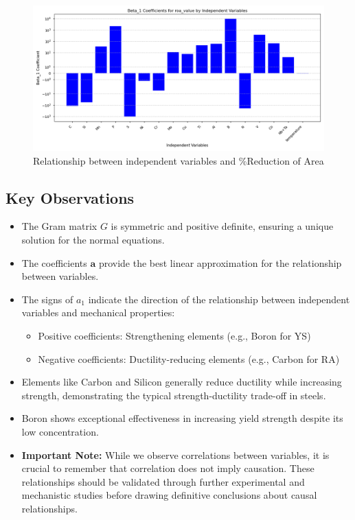 \documentclass[10pt]{article}
\begin{document}
\begin{figure}[H]
    \centering
    \includegraphics[width=\imagewidth\textwidth]{figures/03_leastsq/roa_value_beta1_bar_chart.png}
    \caption{Relationship between independent variables and \%Reduction of Area}
\end{figure}

\newpage
\subsection{Key Observations}
\begin{itemize}
    \item The Gram matrix $G$ is symmetric and positive definite, ensuring a unique solution for the normal equations.
    \item The coefficients $\mathbf{a}$ provide the best linear approximation for the relationship between variables.
    \item The signs of $a_1$ indicate the direction of the relationship between independent variables and mechanical properties:
    \begin{itemize}
        \item Positive coefficients: Strengthening elements (e.g., Boron for YS)
        \item Negative coefficients: Ductility-reducing elements (e.g., Carbon for RA)
    \end{itemize}
    \item Elements like Carbon and Silicon generally reduce ductility while increasing strength, demonstrating the typical strength-ductility trade-off in steels.
    \item Boron shows exceptional effectiveness in increasing yield strength despite its low concentration.
    \item \textbf{Important Note:} While we observe correlations between variables, it is crucial to remember that correlation does not imply causation. These relationships should be validated through further experimental and mechanistic studies before drawing definitive conclusions about causal relationships.
\end{itemize}
\end{document}
